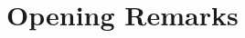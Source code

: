 \documentclass[../sands-adaptation.tex]{subfiles}
\begin{document}
\section{Opening Remarks}


\end{document}
